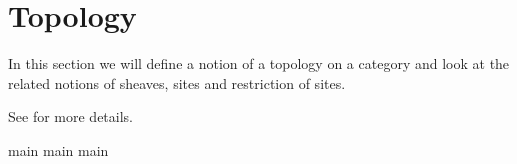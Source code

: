 \section{Topology}
In this section we will define a notion of a topology on a category and 
look at the related notions of sheaves, sites and restriction of sites.

See \cite{sheavGeomLogic} for more details.


{main}
{main}
{main}
